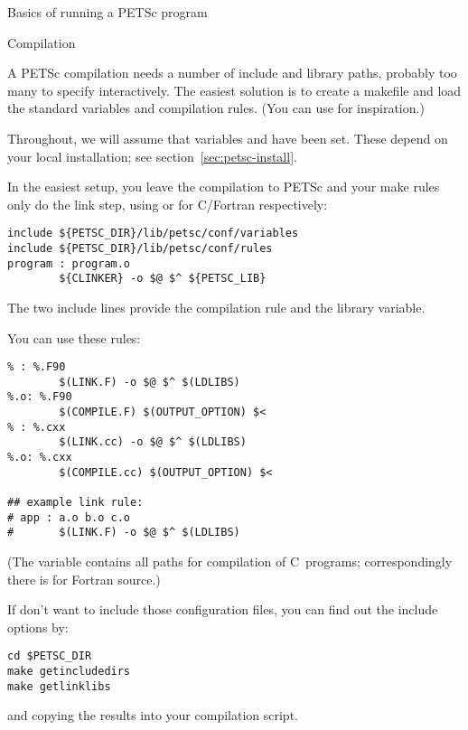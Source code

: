  {Basics of running a PETSc program}

 {Compilation}

A PETSc compilation needs a number of include and library paths,
probably too many to specify interactively. The easiest solution is to
create a makefile and load the standard variables and compilation rules.
(You can use  for inspiration.)

Throughout, we will assume that variables  and
 have been set.
These depend on your local installation; see section~\ref{sec:petsc-install}.

In the easiest setup, you leave the compilation to PETSc and
your make rules only do the link step, using 
or  for C/Fortran respectively:
\begin{verbatim}
include ${PETSC_DIR}/lib/petsc/conf/variables
include ${PETSC_DIR}/lib/petsc/conf/rules
program : program.o
        ${CLINKER} -o $@ $^ ${PETSC_LIB}
\end{verbatim}
The two include lines provide the compilation rule and the library
variable.

You can use these rules:
\begin{verbatim}
% : %.F90
        $(LINK.F) -o $@ $^ $(LDLIBS)
%.o: %.F90
        $(COMPILE.F) $(OUTPUT_OPTION) $<
% : %.cxx
        $(LINK.cc) -o $@ $^ $(LDLIBS)
%.o: %.cxx
        $(COMPILE.cc) $(OUTPUT_OPTION) $<

## example link rule:
# app : a.o b.o c.o
#       $(LINK.F) -o $@ $^ $(LDLIBS)
\end{verbatim}
\begin{comment}
include ${PETSC_DIR}/lib/petsc/conf/variables
        ${CC} -c $^ ${PETSC_CC_INCLUDES}
program : program.o
        ${CLINKER} -o $@ $^ ${PETSC_LIB}
\end{comment}
(The  variable contains all paths for
compilation of C~programs; correspondingly there is
 for Fortran source.)

If don't want to include those configuration files, you can find out
the include options by:
\begin{verbatim}
cd $PETSC_DIR
make getincludedirs
make getlinklibs
\end{verbatim}
and copying the results into your compilation script.


